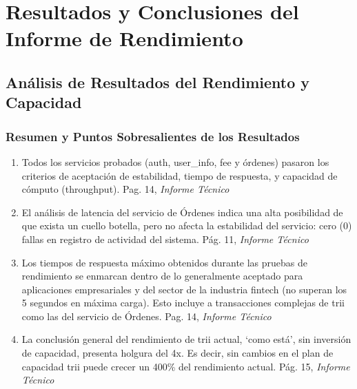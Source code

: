 \documentclass[
  paper=a4,
  ,captions=tableheading
]{scrartcl}
\providecommand{\tightlist}{%
  \setlength{\itemsep}{0pt}\setlength{\parskip}{0pt}}
\renewenvironment{quote}{\begin{customblockquote}\list{}{\rightmargin=0em\leftmargin=0em}%
\item\relax\color{blockquote-text}\ignorespaces}{\unskip\unskip\endlist\end{customblockquote}}
\begin{document}
\newpage

\section{Resultados y Conclusiones del Informe de
Rendimiento}\label{sec:resultados-y-conclusiones-del-informe-de-rendimiento}

\subsection{Análisis de Resultados del Rendimiento y
Capacidad}\label{sec:anuxe1lisis-de-resultados-del-rendimiento-y-capacidad}

\begin{quote}
\end{quote}

\subsubsection{Resumen y Puntos Sobresalientes de los
Resultados}\label{sec:resumen-y-puntos-sobresalientes-de-los-resultados}

\begin{enumerate}
\def\labelenumi{\arabic{enumi}.}
\tightlist
\item
  Todos los servicios probados (auth, user\_info, fee y órdenes) pasaron
  los criterios de aceptación de estabilidad, tiempo de respuesta, y
  capacidad de cómputo (throughput). Pag. 14, \emph{Informe Técnico}
\item
  El análisis de latencia del servicio de Órdenes indica una alta
  posibilidad de que exista un cuello botella, pero no afecta la
  estabilidad del servicio: cero (0) fallas en registro de actividad del
  sistema. Pág. 11, \emph{Informe Técnico}
\item
  Los tiempos de respuesta máximo obtenidos durante las pruebas de
  rendimiento se enmarcan dentro de lo generalmente aceptado para
  aplicaciones empresariales y del sector de la industria fintech (no
  superan los 5 segundos en máxima carga). Esto incluye a transacciones
  complejas de trii como las del servicio de Órdenes. Pag. 14,
  \emph{Informe Técnico}
\item
  La conclusión general del rendimiento de trii actual, `como está', sin
  inversión de capacidad, presenta holgura del 4x. Es decir, sin cambios
  en el plan de capacidad trii puede crecer un 400\% del rendimiento
  actual. Pág. 15, \emph{Informe Técnico}
\end{enumerate}
\end{document}
